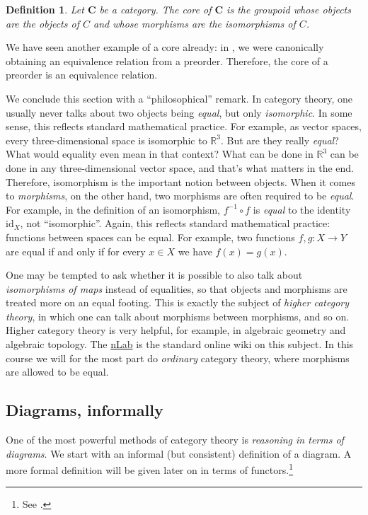 \documentclass[12pt,oneside,headings=small]{scrbook}
\numberwithin{equation}{section}
\theoremstyle{plain}
\newtheorem{deph}[thm]{Definition}
\theoremstyle{definition}
\newcommand{\R}{\mathbb{R}}
\newcommand{\cat}[1]{{\mathbf{#1}}} %
\DeclareMathOperator{\1}{\mathbbm{1}}
\DeclareMathOperator{\2}{\mathbbm{2}}
\newcommand{\id}{\mathrm{id}} %
\begin{document}
\begin{deph}\label{core}
 Let $\cat{C}$ be a category. The \emph{core} of $\cat{C}$ is the groupoid whose objects are the objects of $C$ and whose morphisms are the isomorphisms of $C$. 
\end{deph}

We have seen another example of a core already: in , we were canonically obtaining an equivalence relation from a preorder. Therefore, the core of a preorder is an equivalence relation.

We conclude this section with a ``philosophical'' remark. In category theory, one usually never talks about two objects being \emph{equal}, but only \emph{isomorphic}. In some sense, this reflects standard mathematical practice. For example, as vector spaces, every three-dimensional space is isomorphic to $\R^3$. But are they really \emph{equal}? What would equality even mean in that context? What can be done in $\R^3$ can be done in any three-dimensional vector space, and that's what matters in the end. Therefore, isomorphism is the important notion between objects. 
When it comes to \emph{morphisms}, on the other hand, two morphisms are often required to be \emph{equal}. For example, in the definition of an isomorphism, $f^{-1}\circ f$ is \emph{equal} to the identity $\id_X$, not ``isomorphic''.
Again, this reflects standard mathematical practice: functions between spaces can be equal. For example, two functions $f,g:X\to Y$ are equal if and only if for every $x\in X$ we have $f(x)=g(x)$. 

One may be tempted to ask whether it is possible to also talk about \emph{isomorphisms of maps} instead of equalities, so that objects and morphisms are treated more on an equal footing. This is exactly the subject of \emph{higher category theory}, in which one can talk about morphisms between morphisms, and so on. Higher category theory is very helpful, for example, in algebraic geometry and algebraic topology. The \href{http://ncatlab.org}{nLab} is the standard online wiki on this subject. 
In this course we will for the most part do \emph{ordinary} category theory, where morphisms are allowed to be equal. 


\subsection{Diagrams, informally}\label{infdiagrams}

One of the most powerful methods of category theory is \emph{reasoning in terms of diagrams}. 
We start with an informal (but consistent) definition of a diagram. A more formal definition will be given later on in terms of functors.\footnote{See .}
\end{document}

